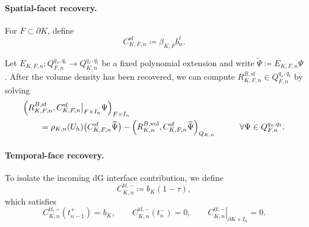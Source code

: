 \paragraph{Spatial-facet recovery.}
For \(F\subset\partial K\), define
\begin{equation}
  C_{K,F,n}^{\mathrm{sf}}
  \coloneqq
  \beta_{K,F}b_n^t.
  \label{eq:space-time-spatial-cone}
\end{equation}

Let
\(
  E_{K,F,n}:
  Q_{F,n}^{q_x,q_t}
  \longrightarrow
  Q_{K,n}^{q_x,q_t}
\)
be a fixed polynomial extension and write \(\widetilde\Psi\coloneqq E_{K,F,n}\Psi\). After the volume density has been recovered, we can compute \(R_{K,F,n}^{B,\mathrm{sf}}\in Q_{F,n}^{q_x,q_t}\) by solving
\begin{align}
  &\Bigl(
    R_{K,F,n}^{B,\mathrm{sf}},
    \bigl.C_{K,F,n}^{\mathrm{sf}}\bigr|_{F\times I_n}\Psi
  \Bigr)_{F\times I_n}
  \notag\\
  &\qquad =
  \rho_{K,n}(U_h)
  \bigl(C_{K,F,n}^{\mathrm{sf}}\widetilde\Psi\bigr)
  -
  \Bigl(
    R_{K,n}^{B,\mathrm{vol}},
    C_{K,F,n}^{\mathrm{sf}}\widetilde\Psi
  \Bigr)_{Q_{K,n}}
  \qquad \quad
  \forall\Psi\in Q_{F,n}^{q_x,q_t}.
  \label{eq:space-time-spatial-facet-projection}
\end{align}


\paragraph{Temporal-face recovery.}
To isolate the incoming dG interface contribution, we define
\begin{equation}
  C_{K,n}^{\mathrm{tf},-}
  \coloneqq
  b_K(1-\tau),
  \label{eq:temporal-trace-cone}
\end{equation}
which satisfies
\begin{equation*}
  C_{K,n}^{\mathrm{tf},-}(t_{n-1}^{+})=b_K,
  \qquad
  C_{K,n}^{\mathrm{tf},-}(t_n^{-})=0,
  \qquad
  \left.C_{K,n}^{\mathrm{tf},-}\right|_{\partial K\times I_n}=0.
  \label{eq:temporal-cone-traces}
\end{equation*}

